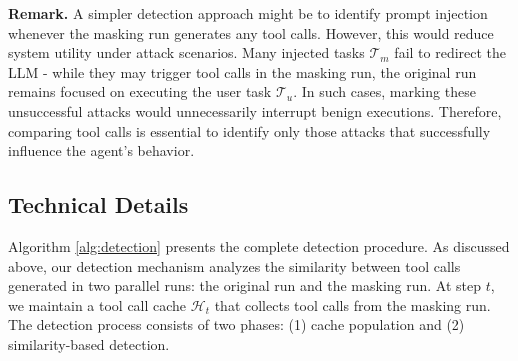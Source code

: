 \textbf{Remark.} 
A simpler detection approach might be to identify prompt injection whenever the masking run generates any tool calls. However, this would reduce system utility under attack scenarios. Many injected tasks $\mathcal{T}_m$ fail to redirect the LLM - while they may trigger tool calls in the masking run, the original run remains focused on executing the user task $\mathcal{T}_u$. In such cases, marking these unsuccessful attacks would unnecessarily interrupt benign executions. Therefore, comparing tool calls is essential to identify only those attacks that successfully influence the agent's behavior.




\subsection{Technical Details}
\label{subsec:details}


Algorithm \ref{alg:detection} presents the complete detection procedure. As discussed above, our detection mechanism analyzes the similarity between tool calls generated in two parallel runs: the original run and the masking run. At step $t$, we maintain a tool call cache $\mathcal{H}_t$ that collects tool calls from the masking run. The detection process consists of two phases: (1) cache population and (2) similarity-based detection.

